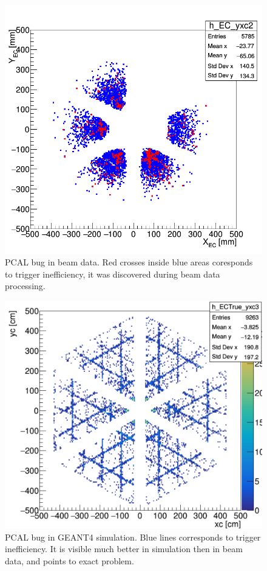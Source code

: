 \begin{figure}[hbt]
	\centering
	\includegraphics[width=1.0\columnwidth,keepaspectratio]{img/PCAL_bug_data.png}
	\caption{PCAL bug in beam data. Red crosses inside blue areas coresponds to trigger inefficiency, it was discovered during beam data processing.}
	\label{fig:PCAL_bug_data}
\end{figure}

\begin{figure}[hbt]
	\centering
	\includegraphics[width=1.0\columnwidth,keepaspectratio]{img/PCAL_bug_hls.png}
	\caption{PCAL bug in GEANT4 simulation. Blue lines corresponds to trigger inefficiency. It is visible much better in simulation then in beam data, and points to exact problem.}
	\label{fig:PCAL_bug_hls}
\end{figure}

